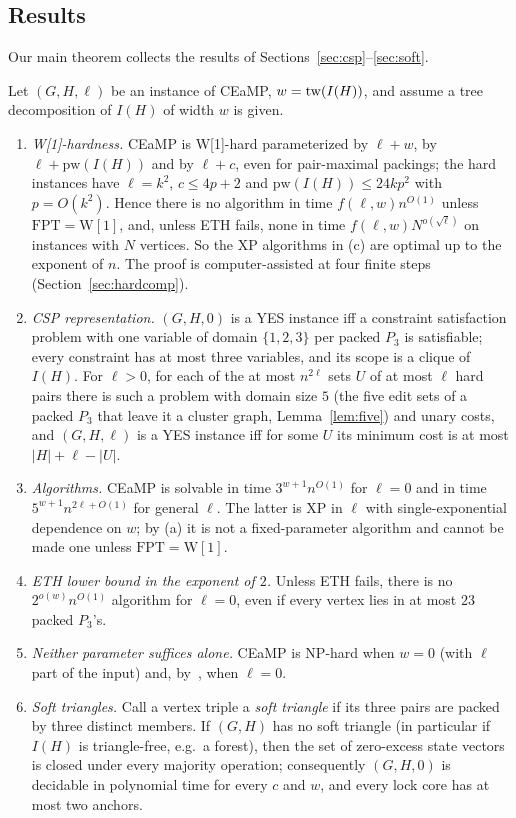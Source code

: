 \subsection{Results}
Our main theorem collects the results of Sections~\ref{sec:csp}--\ref{sec:soft}.
\begin{theorem}\label{thm:main}
Let $(G,H,\ell)$ be an instance of CEaMP, $w=\mathrm{tw}(I(H))$, and assume a tree decomposition of $I(H)$ of width $w$ is given.
\begin{enumerate}
\item[(a)] \emph{W[1]-hardness.} CEaMP is W[1]-hard parameterized by $\ell+w$, by $\ell+\mathrm{pw}(I(H))$ and by $\ell+c$, even for pair-maximal packings; the hard instances have $\ell=k^2$, $c\le4p+2$ and $\mathrm{pw}(I(H))\le24kp^2$ with $p=O(k^2)$. Hence there is no algorithm in time $f(\ell,w)n^{O(1)}$ unless $\mathrm{FPT}=\mathrm{W[1]}$, and, unless ETH fails, none in time $f(\ell,w)N^{o(\sqrt\ell)}$ on instances with $N$ vertices. So the XP algorithms in (c) are optimal up to the exponent of $n$. The proof is computer-assisted at four finite steps (Section~\ref{sec:hardcomp}).
\item[(b)] \emph{CSP representation.} $(G,H,0)$ is a YES instance iff a constraint satisfaction problem with one variable of domain $\{1,2,3\}$ per packed $P_3$ is satisfiable; every constraint has at most three variables, and its scope is a clique of $I(H)$. For $\ell>0$, for each of the at most $n^{2\ell}$ sets $U$ of at most $\ell$ hard pairs there is such a problem with domain size $5$ (the five edit sets of a packed $P_3$ that leave it a cluster graph, Lemma~\ref{lem:five}) and unary costs, and $(G,H,\ell)$ is a YES instance iff for some $U$ its minimum cost is at most $|H|+\ell-|U|$.
\item[(c)] \emph{Algorithms.} CEaMP is solvable in time $3^{w+1}n^{O(1)}$ for $\ell=0$ and in time $5^{w+1}n^{2\ell+O(1)}$ for general $\ell$. The latter is XP in $\ell$ with single-exponential dependence on $w$; by (a) it is not a fixed-parameter algorithm and cannot be made one unless $\mathrm{FPT}=\mathrm{W[1]}$.
\item[(d)] \emph{ETH lower bound in the exponent of $2$.} Unless ETH fails, there is no $2^{o(w)}n^{O(1)}$ algorithm for $\ell=0$, even if every vertex lies in at most $23$ packed $P_3$'s.
\item[(e)] \emph{Neither parameter suffices alone.} CEaMP is NP-hard when $w=0$ (with $\ell$ part of the input) and, by~\cite{LPS23}, when $\ell=0$.
\item[(f)] \emph{Soft triangles.} Call a vertex triple a \emph{soft triangle} if its three pairs are packed by three distinct members. If $(G,H)$ has no soft triangle (in particular if $I(H)$ is triangle-free, e.g.\ a forest), then the set of zero-excess state vectors is closed under every majority operation; consequently $(G,H,0)$ is decidable in polynomial time for every $c$ and $w$, and every lock core has at most two anchors.

\end{enumerate}
\end{theorem}
